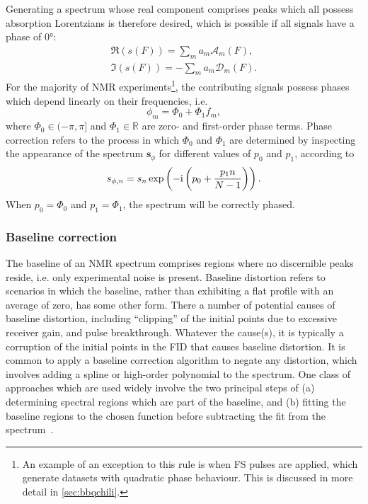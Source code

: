 Generating a spectrum whose real component comprises peaks which all possess
absorption Lorentzians is therefore desired, which is possible if all signals
have a phase of \ang{0}:
\begin{subequations}
    \begin{gather}
        \Re(s(F)) = \sum_m a_m \mathcal{A}_m(F),\label{eq:absorption}\\
        \Im(s(F)) = -\sum_m a_m \mathcal{D}_m(F).\label{eq:dispersion}
    \end{gather}
\end{subequations}
For the majority of \ac{NMR} experiments\footnote{
     An example of an exception to this rule is when \acl{FS} pulses are applied,
     which generate datasets with quadratic phase behaviour. This is discussed
     in more detail in \cref{sec:bbqchili}.
}, the contributing signals possess phases which depend linearly on their
frequencies, i.e.
\begin{equation}
    \phi_m = \Phi_0 + \Phi_1 f_m,
\end{equation}
where $\Phi_0 \in (-\pi, \pi]$ and $\Phi_1 \in \mathbb{R}$ are zero- and
first-order phase terms.
Phase correction refers to the process in which $\Phi_0$ and $\Phi_1$ are
determined by inspecting the appearance of the spectrum
$\symbf{s}_{\phi}$ for different values of $p_0$ and  $p_1$, according to
\begin{equation}
    s_{\phi,n} = s_n
    \exp\left(-\mathrm{i} \left(p_0 + \frac{p_1 n}{N - 1}\right)\right).
\end{equation}
When $p_0 = \Phi_0$ and  $p_1 = \Phi_1$, the spectrum will be correctly phased.

\subsubsection{Baseline correction}
The baseline of an \ac{NMR} spectrum comprises regions where
no discernible peaks reside, i.e. only experimental noise is present.
Baseline distortion refers to scenarios in which the baseline, rather
than exhibiting a flat profile with an average of zero, has some other form.
There a number of potential causes of baseline distortion, including
``clipping'' of the initial points due to excessive receiver gain,
and pulse breakthrough.
Whatever the cause(s), it is typically a corruption of the initial points in
the \ac{FID} that causes baseline distortion.
It is common to apply a baseline correction algorithm to negate any distortion,
which involves adding a spline or high-order polynomial to the spectrum.
One class of approaches which are used widely involve the two principal steps
of (a) determining spectral regions which are part of the baseline, and (b)
fitting the baseline regions to the chosen
function before subtracting the fit from the
spectrum~\cite{Dietrich1991,Cobas2006}.

